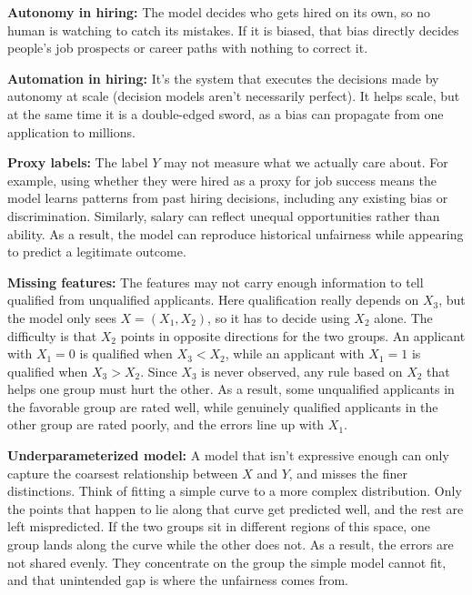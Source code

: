 \documentclass{cisXXX} %
\begin{document}
\HWsubproblem
\textbf{Autonomy in hiring:} The model decides who gets hired on its own, so no human is watching to catch its mistakes. If it is biased, that bias directly decides people's job prospects or career paths with nothing to correct it.

\HWsubproblem
\textbf{Automation in hiring:} It's the system that executes the decisions made by autonomy at scale (decision models aren't necessarily perfect). It helps scale, but at the same time it is a double-edged sword, as a bias can propagate from one application to millions.

\HWproblem
\HWsubproblem
\textbf{Proxy labels:} The label $Y$ may not measure what we actually care about. For example, using whether they were hired as a proxy for job success means the model learns patterns from past hiring decisions, including any existing bias or discrimination. Similarly, salary can reflect unequal opportunities rather than ability. As a result, the model can reproduce historical unfairness while appearing to predict a legitimate outcome.

\HWsubproblem
\textbf{Missing features:} The features may not carry enough information to tell qualified from unqualified applicants. Here qualification really depends on $X_3$, but the model only sees $X = (X_1, X_2)$, so it has to decide using $X_2$ alone. The difficulty is that $X_2$ points in opposite directions for the two groups. An applicant with $X_1 = 0$ is qualified when $X_3 < X_2$, while an applicant with $X_1 = 1$ is qualified when $X_3 > X_2$. Since $X_3$ is never observed, any rule based on $X_2$ that helps one group must hurt the other. As a result, some unqualified applicants in the favorable group are rated well, while genuinely qualified applicants in the other group are rated poorly, and the errors line up with $X_1$.

\HWsubproblem
\textbf{Underparameterized model:} A model that isn't expressive enough can only capture the coarsest relationship between $X$ and $Y$, and misses the finer distinctions. Think of fitting a simple curve to a more complex distribution. Only the points that happen to lie along that curve get predicted well, and the rest are left mispredicted. If the two groups sit in different regions of this space, one group lands along the curve while the other does not. As a result, the errors are not shared evenly. They concentrate on the group the simple model cannot fit, and that unintended gap is where the unfairness comes from.
\end{document}
